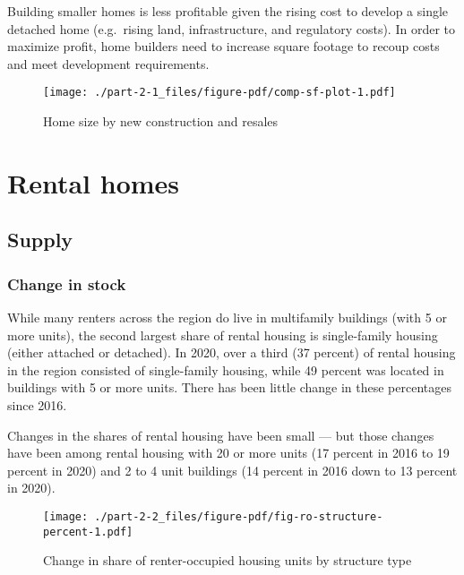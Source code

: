 \documentclass[
  letterpaper,
  DIV=11,
  numbers=noendperiod]{scrreprt}
\begin{document}
Building smaller homes is less profitable given the rising cost to
develop a single detached home (e.g.~rising land, infrastructure, and
regulatory costs). In order to maximize profit, home builders need to
increase square footage to recoup costs and meet development
requirements.

\begin{figure}

{\centering \texttt{[image: ./part-2-1\_files/figure-pdf/comp-sf-plot-1.pdf]}

}

\caption{Home size by new construction and resales}

\end{figure}

\hypertarget{part-2-2}{%
\chapter{Rental homes}\label{part-2-2}}

\hypertarget{supply-2}{%
\section{Supply}\label{supply-2}}

\hypertarget{change-in-stock-1}{%
\subsection{Change in stock}\label{change-in-stock-1}}

While many renters across the region do live in multifamily buildings
(with 5 or more units), the second largest share of rental housing is
single-family housing (either attached or detached). In 2020, over a
third (37 percent) of rental housing in the region consisted of
single-family housing, while 49 percent was located in buildings with 5
or more units. There has been little change in these percentages since
2016.

Changes in the shares of rental housing have been small --- but those
changes have been among rental housing with 20 or more units (17 percent
in 2016 to 19 percent in 2020) and 2 to 4 unit buildings (14 percent in
2016 down to 13 percent in 2020).

\begin{figure}

{\centering \texttt{[image: ./part-2-2\_files/figure-pdf/fig-ro-structure-percent-1.pdf]}

}

\caption{\label{fig-ro-structure-percent}Change in share of
renter-occupied housing units by structure type}

\end{figure}
\end{document}
